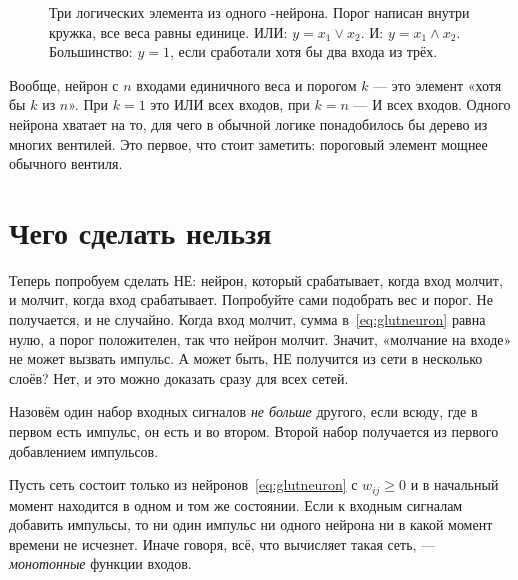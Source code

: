 \begin{figure}[t]
\centering
{}
\caption{Три логических элемента из одного -нейрона. Порог написан внутри кружка, все веса равны единице. ИЛИ: $y=x_1\vee x_2$. И: $y=x_1\wedge x_2$. Большинство: $y=1$, если сработали хотя бы два входа из трёх.}
\label{fig:gates}
\end{figure}

Вообще, нейрон с $n$ входами единичного веса и порогом $k$ --- это элемент «хотя бы $k$ из $n$». При $k=1$ это ИЛИ всех входов, при $k=n$ --- И всех входов. Одного нейрона хватает на то, для чего в обычной логике понадобилось бы дерево из многих вентилей. Это первое, что стоит заметить: пороговый элемент мощнее обычного вентиля.

\section{Чего сделать нельзя}

Теперь попробуем сделать НЕ: нейрон, который срабатывает, когда вход молчит, и молчит, когда вход срабатывает. Попробуйте сами подобрать вес и порог. Не получается, и не случайно. Когда вход молчит, сумма в~\eqref{eq:glutneuron} равна нулю, а порог положителен, так что нейрон молчит. Значит, «молчание на входе» не может вызвать импульс. А может быть, НЕ получится из сети в несколько слоёв? Нет, и это можно доказать сразу для всех сетей.

Назовём один набор входных сигналов \emph{не больше} другого, если всюду, где в первом есть импульс, он есть и во втором. Второй набор получается из первого добавлением импульсов.

\begin{keyblock}
\begin{proposition}[Монотонность]
\label{prop:monotone}
Пусть сеть состоит только из нейронов~\eqref{eq:glutneuron} с $w_{ij}\ge0$ и в начальный момент находится в одном и том же состоянии. Если к входным сигналам добавить импульсы, то ни один импульс ни одного нейрона ни в какой момент времени не исчезнет. Иначе говоря, всё, что вычисляет такая сеть, --- \emph{монотонные} функции входов.
\end{proposition}
\end{keyblock}

